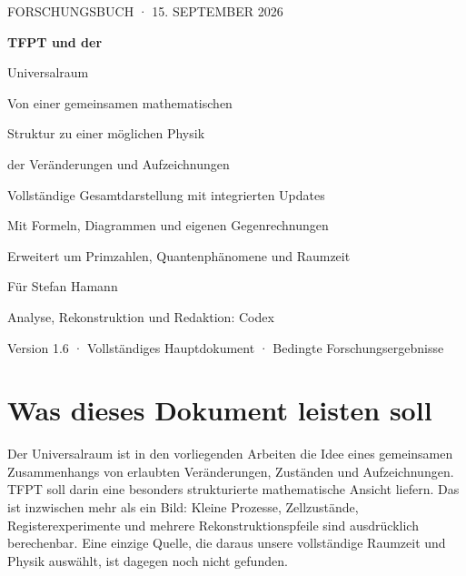 \documentclass[11pt,a4paper,oneside,parskip=half,headings=normal]{scrreprt}
\begin{document}
\hypersetup{pageanchor=false}
\begin{titlepage}
\pagecolor{navy}\color{white}
\vspace*{5mm}
{\sffamily\large FORSCHUNGSBUCH · 15. SEPTEMBER 2026\par}
\vspace{22mm}
{\sffamily\bfseries\fontsize{36}{42}\selectfont TFPT und der\par Universalraum\par}
\vspace{12mm}
{\sffamily\fontsize{17}{23}\selectfont Von einer gemeinsamen mathematischen\par Struktur zu einer möglichen Physik\par der Veränderungen und Aufzeichnungen\par}
\vspace{15mm}
\vfill
{\sffamily\large Vollständige Gesamtdarstellung mit integrierten Updates\par}
\vspace{4mm}
{\sffamily\normalsize Mit Formeln, Diagrammen und eigenen Gegenrechnungen\par Erweitert um Primzahlen, Quantenphänomene und Raumzeit\par}
\vspace{12mm}
{\sffamily\small Für Stefan Hamann\par Analyse, Rekonstruktion und Redaktion: Codex\par}
\vspace{6mm}
{\sffamily\small\color{white!75}Version 1.6 · Vollständiges Hauptdokument · Bedingte Forschungsergebnisse\par}
\end{titlepage}
\nopagecolor\color{black}
\hypersetup{pageanchor=true}
\chapter*{Was dieses Dokument leisten soll}
Der Universalraum ist in den vorliegenden Arbeiten die Idee eines gemeinsamen Zusammenhangs von erlaubten Veränderungen, Zuständen und Aufzeichnungen. TFPT soll darin eine besonders strukturierte mathematische Ansicht liefern. Das ist inzwischen mehr als ein Bild: Kleine Prozesse, Zellzustände, Registerexperimente und mehrere Rekonstruktionspfeile sind ausdrücklich berechenbar. Eine einzige Quelle, die daraus unsere vollständige Raumzeit und Physik auswählt, ist dagegen noch nicht gefunden.
\end{document}
